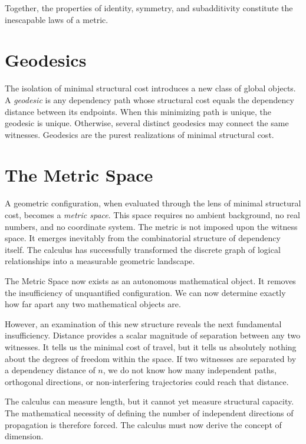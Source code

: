 \documentclass[12pt,anyside]{book}
\newcommand{\term}[1]{\textit{#1}}             %
\begin{document}
Together, the properties of identity, symmetry, and subadditivity constitute the inescapable laws of a metric. 

\section{Geodesics}
The isolation of minimal structural cost introduces a new class of global objects. A \term{geodesic} is any dependency path whose structural cost equals the dependency distance between its endpoints. When this minimizing path is unique, the geodesic is unique. Otherwise, several distinct geodesics may connect the same witnesses. Geodesics are the purest realizations of minimal structural cost.

\section{The Metric Space}
A geometric configuration, when evaluated through the lens of minimal structural cost, becomes a \term{metric space}. This space requires no ambient background, no real numbers, and no coordinate system. The metric is not imposed upon the witness space. It emerges inevitably from the combinatorial structure of dependency itself. The calculus has successfully transformed the discrete graph of logical relationships into a measurable geometric landscape.

The Metric Space now exists as an autonomous mathematical object. It removes the insufficiency of unquantified configuration. We can now determine exactly how far apart any two mathematical objects are. 

However, an examination of this new structure reveals the next fundamental insufficiency. Distance provides a scalar magnitude of separation between any two witnesses. It tells us the minimal cost of travel, but it tells us absolutely nothing about the degrees of freedom within the space. If two witnesses are separated by a dependency distance of $n$, we do not know how many independent paths, orthogonal directions, or non-interfering trajectories could reach that distance. 

The calculus can measure length, but it cannot yet measure structural capacity. The mathematical necessity of defining the number of independent directions of propagation is therefore forced. The calculus must now derive the concept of dimension.
\end{document}

